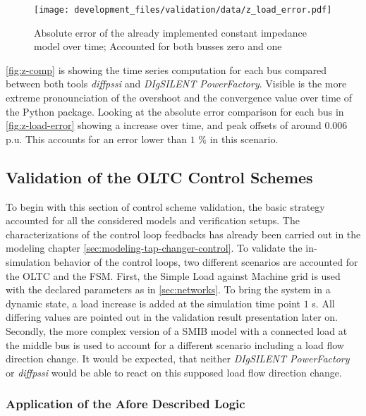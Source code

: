 \begin{figure}[htbp!]
    \centering
    \texttt{[image: development\_files/validation/data/z\_load\_error.pdf]}
    \caption[Absolute error comparison of the constant impedance model]{Absolute error of the already implemented constant impedance model over time; Accounted for both busses zero and one}
    \label{fig:z-load-error}
\end{figure}

\autoref{fig:z-comp} is showing the time series computation for each bus compared between both tools \textit{diffpssi} and \textit{DIgSILENT PowerFactory}.
Visible is the more extreme pronounciation of the overshoot and the convergence value over time of the Python package.
Looking at the absolute error comparison for each bus in \autoref{fig:z-load-error} showing a increase over time, and peak offsets of around $0.006$ p.u.
This accounts for an error lower than $1$ \% in this scenario.

\subsection{Validation of the OLTC Control Schemes}
\label{sec:validation-oltc-schemes}

To begin with this section of control scheme validation, the basic strategy accounted for all the considered models and verification setups.
The characterizations of the control loop feedbacks has already been carried out in the modeling chapter \autoref{sec:modeling-tap-changer-control}.
To validate the in-simulation behavior of the control loops, two different scenarios are accounted for the \acs{OLTC} and the \acs{FSM}.
First, the Simple Load against Machine grid is used with the declared parameters as in \autoref{sec:networks}.
To bring the system in a dynamic state, a load increase is added at the simulation time point $1$ s.
All differing values are pointed out in the validation result presentation later on.
Secondly, the more complex version of a \acs{SMIB} model with a connected load at the middle bus is used to account for a different scenario including a load flow direction change.
It would be expected, that neither \textit{DIgSILENT PowerFactory} or \textit{diffpssi} would be able to react on this supposed load flow direction change.

\subsubsection{Application of the Afore Described Logic}

